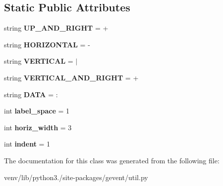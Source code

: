 \subsection*{Static Public Attributes}
\begin{DoxyCompactItemize}
\item 
\mbox{\label{classgevent_1_1util_1_1___tree_formatter_a25ac33fc3559f083520301fe980d44a0}} 
string {\bfseries U\+P\+\_\+\+A\+N\+D\+\_\+\+R\+I\+G\+HT} = \textquotesingle{}+\textquotesingle{}
\item 
\mbox{\label{classgevent_1_1util_1_1___tree_formatter_a277a13d56dcb7d29bfd94652ba515335}} 
string {\bfseries H\+O\+R\+I\+Z\+O\+N\+T\+AL} = \textquotesingle{}-\/\textquotesingle{}
\item 
\mbox{\label{classgevent_1_1util_1_1___tree_formatter_a98730919bf519c63cb4cae07aeb6562f}} 
string {\bfseries V\+E\+R\+T\+I\+C\+AL} = \textquotesingle{}$\vert$\textquotesingle{}
\item 
\mbox{\label{classgevent_1_1util_1_1___tree_formatter_a14200261218a38cf05f32331cd5d7c32}} 
string {\bfseries V\+E\+R\+T\+I\+C\+A\+L\+\_\+\+A\+N\+D\+\_\+\+R\+I\+G\+HT} = \textquotesingle{}+\textquotesingle{}
\item 
\mbox{\label{classgevent_1_1util_1_1___tree_formatter_a92d1ec079edc44bb8edeee8e04bcb91d}} 
string {\bfseries D\+A\+TA} = \textquotesingle{}\+:\textquotesingle{}
\item 
\mbox{\label{classgevent_1_1util_1_1___tree_formatter_ae7af0e16c74c4801aa0cd64f1fb14a5f}} 
int {\bfseries label\+\_\+space} = 1
\item 
\mbox{\label{classgevent_1_1util_1_1___tree_formatter_ad394790584d912acc0274bd03a4b354c}} 
int {\bfseries horiz\+\_\+width} = 3
\item 
\mbox{\label{classgevent_1_1util_1_1___tree_formatter_aefe0064047efee1ba2ca2d10a7d1c66c}} 
int {\bfseries indent} = 1
\end{DoxyCompactItemize}


The documentation for this class was generated from the following file\+:\begin{DoxyCompactItemize}
\item 
venv/lib/python3./site-\/packages/gevent/util.\+py\end{DoxyCompactItemize}
